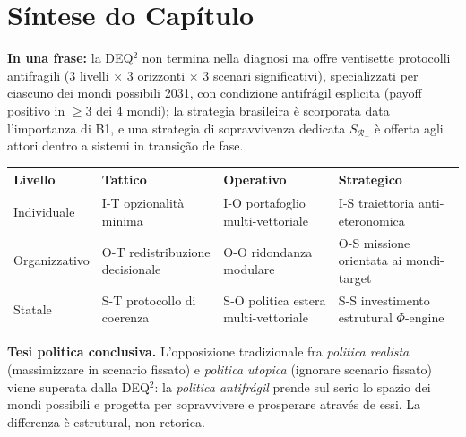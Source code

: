 \section{Síntese do Capítulo}\label{sintesi-del-capítulo}

\Proved{} \textbf{In una frase:} la DEQ$^2$ non termina nella diagnosi ma
offre ventisette protocolli antifragili (3 livelli $\times$ 3 orizzonti $\times$ 3
scenari significativi), specializzati per ciascuno dei mondi possibili
2031, con condizione antifrágil esplicita (payoff positivo in
\(\geq 3\) dei 4 mondi); la strategia brasileira è scorporata data
l'importanza di B1, e una strategia di sopravvivenza dedicata
\(S_{\mathcal{R}_-}\) è offerta agli attori dentro a sistemi in
transição de fase.

{\def\LTcaptype{none} %
{\small\begin{longtable}[]{@{}
  >{\raggedright\arraybackslash}p{}
  >{\raggedright\arraybackslash}p{}
  >{\raggedright\arraybackslash}p{}
  >{\raggedright\arraybackslash}p{}@{}}
\toprule\noalign{}
\begin{minipage}[b]{\linewidth}\raggedright
Livello
\end{minipage} & \begin{minipage}[b]{\linewidth}\raggedright
Tattico
\end{minipage} & \begin{minipage}[b]{\linewidth}\raggedright
Operativo
\end{minipage} & \begin{minipage}[b]{\linewidth}\raggedright
Strategico
\end{minipage} \\
\midrule\noalign{}
\endhead
\bottomrule\noalign{}
\endlastfoot
Individuale & I-T opzionalità minima & I-O portafoglio multi-vettoriale
& I-S traiettoria anti-eteronomica \\
Organizzativo & O-T redistribuzione decisionale & O-O ridondanza
modulare & O-S missione orientata ai mondi-target \\
Statale & S-T protocollo di coerenza & S-O politica estera
multi-vettoriale & S-S investimento estrutural \(\Phi\)-engine \\
\end{longtable}}
}

\Hypoth{} \textbf{Tesi politica conclusiva.} L'opposizione tradizionale
fra \emph{politica realista} (massimizzare in scenario fissato) e
\emph{politica utopica} (ignorare scenario fissato) viene superata dalla
DEQ$^2$: la \emph{politica antifrágil} prende sul serio lo spazio dei
mondi possibili e progetta per sopravvivere e prosperare através de
essi. La differenza è estrutural, non retorica.



